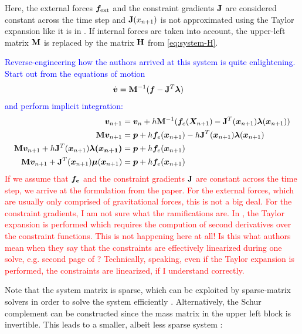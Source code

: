 Here, the external forces $\bm{f}_{\text{ext}}$ and the constraint gradients $\mathbf{J}$ are considered constant across the time step 
and $\mathbf{J}(x_{n+1})$ 
is not approximated using the Taylor expansion like it is in \cite{baraff1998}. If internal forces are taken into account, the upper-left 
matrix $\mathbf{M}$ is replaced by the matrix $\mathbf{H}$ from \autoref{eq:system-H}.

\textcolor{blue}{Reverse-engineering how the authors arrived at this system is quite enlightening. Start out from the equations of motion 
\cite{ascher1995}
    \begin{align*}
        \dot{\bm{v}} &= \mathbf{M}^{-1}(\bm{f} - \mathbf{J}^T \bm{\lambda})
    \end{align*}
    and perform implicit integration:
    \begin{align*}
        \bm{v}_{n+1} &= \bm{v}_n + h\mathbf{M}^{-1}(\bm{f}_e(\bm{X}_{n+1}) - \mathbf{J}^T(\bm{x}_{n+1}) \bm{\lambda}(\bm{x}_{n+1})) \\
        \mathbf{M}\bm{v}_{n+1} &= \bm{p} + h\bm{f}_e(\bm{x}_{n+1}) - h\mathbf{J}^T(\bm{x}_{n+1})\bm{\lambda}(\bm{x}_{n+1}) \\
        \mathbf{M}\bm{v}_{n+1} + h \mathbf{J}^T(\bm{x}_{n+1})\bm{\lambda(\bm{x}_{n+1})} &= \bm{p} + h\bm{f}_e(\bm{x}_{n+1}) \\
        \mathbf{M}\bm{v}_{n+1} + \mathbf{J}^T(\bm{x}_{n+1}) \bm{\mu}(\bm{x}_{n+1}) &= \bm{p} + h\bm{f}_e(\bm{x}_{n+1})
    \end{align*}
}
\textcolor{red}{If we assume that $\bm{f_e}$ and the constraint gradients $\mathbf{J}$ are constant across the time step, we arrive at the 
formulation from the paper. For the external forces, which are usually only comprised of gravitational forces, this is not a big 
deal. For the constraint gradients, I am not sure what the ramifications are. In \cite{baraff1998}, the Taylor expansion is performed
which requires the compution of second derivatives over the constraint functions. This is not happening here at all! Is this what 
authors mean when they say that the constraints are effectively linearized during one solve, e.g. second page 
of \cite{mueller2020}? Technically, speaking, even if the Taylor expansion is performed, the constraints are linearized, if I 
understand correctly.}

Note that the system matrix is sparse, which can be exploited by sparse-matrix solvers in order to solve the system efficiently
\cite{baraff1996}. Alternatively, the Schur complement can be constructed since the mass matrix in the upper left block is invertible.
This leads to a smaller, albeit less sparse system \cite{tournier2015}:

